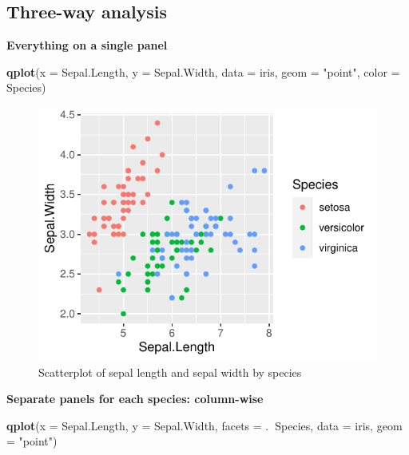 \documentclass[]{article}
\newenvironment{Shaded}{\begin{snugshade}}{\end{snugshade}}
\newcommand{\DataTypeTok}[1]{\textcolor[rgb]{0.13,0.29,0.53}{#1}}
\newcommand{\KeywordTok}[1]{\textcolor[rgb]{0.13,0.29,0.53}{\textbf{#1}}}
\newcommand{\NormalTok}[1]{#1}
\newcommand{\OperatorTok}[1]{\textcolor[rgb]{0.81,0.36,0.00}{\textbf{#1}}}
\newcommand{\StringTok}[1]{\textcolor[rgb]{0.31,0.60,0.02}{#1}}
\begin{document}
\newpage

\hypertarget{three-way-analysis}{%
\subsection{Three-way analysis}\label{three-way-analysis}}

\textbf{Everything on a single panel}

\begin{Shaded}
\begin{Highlighting}[]
\KeywordTok{qplot}\NormalTok{(}\DataTypeTok{x =}\NormalTok{ Sepal.Length, }\DataTypeTok{y =}\NormalTok{ Sepal.Width, }\DataTypeTok{data =}\NormalTok{ iris, }
      \DataTypeTok{geom =} \StringTok{"point"}\NormalTok{, }\DataTypeTok{color =}\NormalTok{ Species)}
\end{Highlighting}
\end{Shaded}

\begin{figure}
\centering
\includegraphics{Week3Answers_files/figure-latex/unnamed-chunk-15-1.pdf}
\caption{Scatterplot of sepal length and sepal width by species}
\end{figure}

\textbf{Separate panels for each species: column-wise}

\begin{Shaded}
\begin{Highlighting}[]
\KeywordTok{qplot}\NormalTok{(}\DataTypeTok{x =}\NormalTok{ Sepal.Length, }\DataTypeTok{y =}\NormalTok{ Sepal.Width, }
      \DataTypeTok{facets =}\NormalTok{ .}\OperatorTok{~}\NormalTok{Species, }\DataTypeTok{data =}\NormalTok{ iris, }\DataTypeTok{geom =} \StringTok{"point"}\NormalTok{) }
\end{Highlighting}
\end{Shaded}
\end{document}
